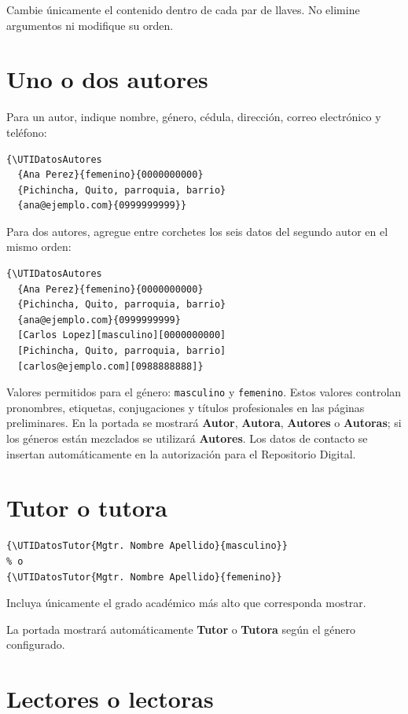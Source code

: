 \documentclass[12pt,a4paper,oneside]{report}
\begin{document}
Cambie únicamente el contenido dentro de cada par de llaves. No elimine argumentos ni modifique su orden.

\section{Uno o dos autores}

Para un autor, indique nombre, género, cédula, dirección, correo electrónico y teléfono:

\begin{lstlisting}
{\UTIDatosAutores
  {Ana Perez}{femenino}{0000000000}
  {Pichincha, Quito, parroquia, barrio}
  {ana@ejemplo.com}{0999999999}}
\end{lstlisting}

Para dos autores, agregue entre corchetes los seis datos del segundo autor en el mismo orden:

\begin{lstlisting}
{\UTIDatosAutores
  {Ana Perez}{femenino}{0000000000}
  {Pichincha, Quito, parroquia, barrio}
  {ana@ejemplo.com}{0999999999}
  [Carlos Lopez][masculino][0000000000]
  [Pichincha, Quito, parroquia, barrio]
  [carlos@ejemplo.com][0988888888]}
\end{lstlisting}

Valores permitidos para el género: \texttt{masculino} y \texttt{femenino}. Estos valores controlan pronombres, etiquetas, conjugaciones y títulos profesionales en las páginas preliminares. En la portada se mostrará \textbf{Autor}, \textbf{Autora}, \textbf{Autores} o \textbf{Autoras}; si los géneros están mezclados se utilizará \textbf{Autores}. Los datos de contacto se insertan automáticamente en la autorización para el Repositorio Digital.

\section{Tutor o tutora}

\begin{lstlisting}
{\UTIDatosTutor{Mgtr. Nombre Apellido}{masculino}}
% o
{\UTIDatosTutor{Mgtr. Nombre Apellido}{femenino}}
\end{lstlisting}

Incluya únicamente el grado académico más alto que corresponda mostrar.

La portada mostrará automáticamente \textbf{Tutor} o \textbf{Tutora} según el género configurado.

\section{Lectores o lectoras}
\end{document}
